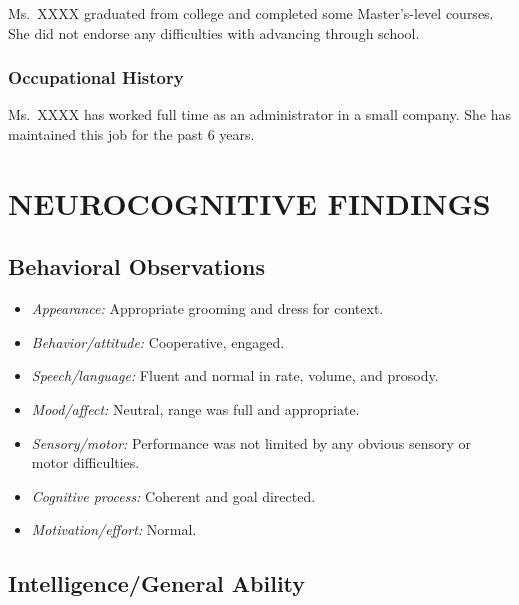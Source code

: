 \documentclass[
  letterpaper,
  DIV=11,
  numbers=noendperiod,
  oneside]{scrartcl}
\providecommand{\tightlist}{%
  \setlength{\itemsep}{0pt}\setlength{\parskip}{0pt}}\usepackage{longtable,booktabs,array}
\begin{document}
Ms.~XXXX graduated from college and completed some Master's-level
courses. She did not endorse any difficulties with advancing through
school.

\hypertarget{occupational-history}{%
\subsubsection{Occupational History}\label{occupational-history}}

Ms.~XXXX has worked full time as an administrator in a small company.
She has maintained this job for the past 6 years.

\hypertarget{neurocognitive-findings}{%
\section{NEUROCOGNITIVE FINDINGS}\label{neurocognitive-findings}}

\hypertarget{behavioral-observations}{%
\subsection{Behavioral Observations}\label{behavioral-observations}}

\begin{itemize}
\tightlist
\item
  \emph{Appearance:} Appropriate grooming and dress for context.
\item
  \emph{Behavior/attitude:} Cooperative, engaged.
\item
  \emph{Speech/language:} Fluent and normal in rate, volume, and
  prosody.
\item
  \emph{Mood/affect:} Neutral, range was full and appropriate.
\item
  \emph{Sensory/motor:} Performance was not limited by any obvious
  sensory or motor difficulties.
\item
  \emph{Cognitive process:} Coherent and goal directed.
\item
  \emph{Motivation/effort:} Normal.
\end{itemize}

\hypertarget{intelligencegeneral-ability}{%
\subsection{Intelligence/General
Ability}\label{intelligencegeneral-ability}}
\end{document}
